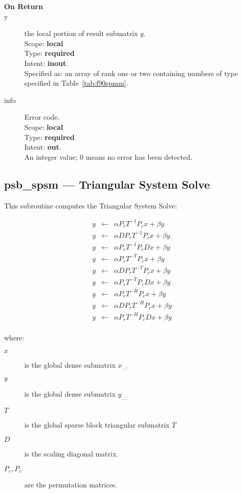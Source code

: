 \begin{description}
\item[\bf On Return]
\item[y] the local portion of result submatrix $y$.\\
Scope: {\bf local} \\
Type: {\bf required} \\
Intent: {\bf inout}.\\
Specified as: an array of rank one or two
containing numbers of type specified in
Table~\ref{tab:f90spmm}.
\item[info] Error code.\\
Scope: {\bf local} \\
Type: {\bf required} \\
Intent: {\bf out}.\\
An integer value; 0 means no error has been detected. 
\end{description}

%
%


\clearpage\subsection*{psb\_spsm --- Triangular System Solve}   

This subroutine computes the Triangular System Solve:

\begin{eqnarray*}
y &\leftarrow& \alpha P_r T^{-1} P_c x + \beta y\\
y &\leftarrow& \alpha D P_r T^{-1} P_c x + \beta y\\
y &\leftarrow& \alpha P_r T^{-1} P_c D x + \beta y\\
y &\leftarrow& \alpha P_r T^{-T} P_c x + \beta y\\
y &\leftarrow& \alpha D P_r T^{-T} P_c x + \beta y\\
y &\leftarrow& \alpha P_r T^{-T} P_c D x + \beta y\\
y &\leftarrow& \alpha P_r T^{-H} P_c x + \beta y\\
y &\leftarrow& \alpha D P_r T^{-H} P_c x + \beta y\\
y &\leftarrow& \alpha P_r T^{-H} P_c D x + \beta y\\
\end{eqnarray*}


where:
\begin{description}
\item[$x$] is the global dense submatrix $x_{:, :}$
\item[$y$] is the global dense submatrix $y_{:, :}$
\item[$T$] is the global sparse block triangular submatrix $T$
\item[$D$] is the scaling diagonal matrix.
\item[$P_r, P_c$] are the permutation matrices.
\end{description}

